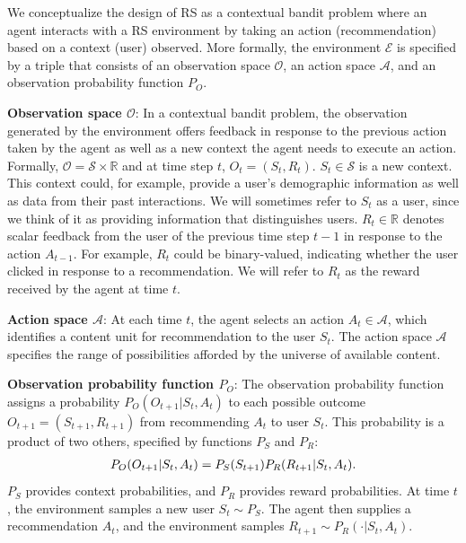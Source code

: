 We conceptualize the design of RS as a contextual bandit problem where an agent interacts with a RS environment by taking an action (recommendation) based on a context (user) observed. More formally, the environment $\mathcal{E}$ is specified by a triple that consists of an observation space $\mathcal{O}$, an action space $\mathcal{A}$, and an observation probability function $P_O$. 

\textbf{Observation space $\mathcal{O}$}: In a contextual bandit problem, the observation generated by the environment offers feedback in response to the previous action taken by the agent as well as a new context the agent needs to execute an action. Formally, $\mathcal{O} = \mathcal{S} \times \mathbb{R}$ and at time step $t$, $O_t = (S_t, R_t)$. $S_t \in \mathcal{S}$ is a new context.  This context could, for example, provide a user's demographic information as well as data from their past interactions.  We will sometimes refer to $S_t$ as a user, since we think of it as providing information that distinguishes users.  $R_t \in \mathbb{R}$ denotes scalar feedback from the user of the previous time step $t-1$ in response to the action $A_{t-1}$.  For example, $R_t$ could be binary-valued, indicating whether the user clicked in response to a recommendation.  We will refer to $R_t$ as the reward received by the agent at time $t$.  

\textbf{Action space $\mathcal{A}$}: At each time $t$, the agent selects an action $A_{t} \in \mathcal{A}$, which identifies a content unit for recommendation to the user $S_t$. The action space $\mathcal{A}$ specifies the range of possibilities afforded by the universe of available content. 

\textbf{Observation probability function $P_O$}: The observation probability function assigns a probability $P_O(O_{t+1}|S_t,A_t)$ to each possible outcome $O_{t+1} = (S_{t+1}, R_{t+1})$ from recommending $A_t$ to user $S_t$.  This probability is a product of two others, specified by functions $P_S$ and $P_R$:
\vspace{-3pt}
\begin{align}
    P_O(O_{t+1} | S_t, A_t) = P_S(S_{t+1})P_{R}(R_{t+1} | S_t, A_t).
\vspace{-5pt}
\end{align}
$P_S$ provides context probabilities, and $P_R$ provides reward probabilities.  At time $t$, the environment samples a new user $S_t \sim P_S$.  The agent then supplies a recommendation $A_t$, and the environment samples $R_{t+1} \sim P_{R}(\cdot| S_t, A_t)$.

